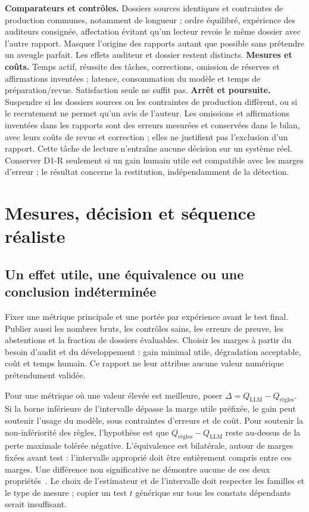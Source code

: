 \documentclass[11pt,a4paper]{article}
\begin{document}
\textbf{Comparateurs et contrôles.} Dossiers sources identiques et contraintes
de production communes, notamment de longueur ; ordre équilibré, expérience des auditeurs consignée,
affectation évitant qu'un lecteur revoie le même dossier avec l'autre rapport.
Masquer l'origine des rapports autant que possible sans prétendre un aveugle
parfait. Les effets auditeur et dossier restent distincts.
\textbf{Mesures et coûts.} Temps actif, réussite des tâches, corrections, omission
de réserves et affirmations inventées ; latence, consommation du modèle et
temps de préparation/revue. Satisfaction seule ne suffit pas.
\textbf{Arrêt et poursuite.} Suspendre si les dossiers sources ou les contraintes
de production diffèrent, ou si le recrutement ne permet qu'un avis de l'auteur.
Les omissions et affirmations inventées dans les rapports sont des erreurs
mesurées et conservées dans le bilan, avec leurs coûts de revue et correction ;
elles ne justifient pas l'exclusion d'un rapport. Cette tâche de lecture
n'entraîne aucune décision sur un système réel. Conserver D1-R seulement si
un gain humain utile est compatible avec les marges d'erreur ; le résultat
concerne la restitution, indépendamment de la détection.

\section{Mesures, décision et séquence réaliste}
\subsection{Un effet utile, une équivalence ou une conclusion indéterminée}
Fixer une métrique principale et une portée par expérience avant le test final.
Publier aussi les nombres bruts, les contrôles sains, les erreurs de preuve,
les abstentions et la fraction de dossiers évaluables. Choisir les marges à
partir du besoin d'audit et du développement : gain minimal utile,
dégradation acceptable, coût et temps humain. Ce rapport ne leur attribue
aucune valeur numérique prétendument validée.

Pour une métrique où une valeur élevée est meilleure, poser
$\Delta=Q_{\mathrm{LLM}}-Q_{\text{règles}}$. Si la borne inférieure de
l'intervalle dépasse la marge utile préfixée, le gain peut soutenir l'usage du
modèle, sous contraintes d'erreurs et de coût. Pour soutenir la non-infériorité des règles, l'hypothèse
est que $Q_{\text{règles}}-Q_{\mathrm{LLM}}$ reste au-dessus de la perte
maximale tolérée négative. L'équivalence est bilatérale, autour de marges fixées
avant test : l'intervalle approprié doit être entièrement compris entre ces
marges. Une différence non significative ne démontre aucune de ces deux
propriétés~\cite{lakens}. Le choix de l'estimateur et de l'intervalle doit
respecter les familles et le type de mesure ; copier un test $t$ générique
sur tous les constats dépendants serait insuffisant.
\end{document}
